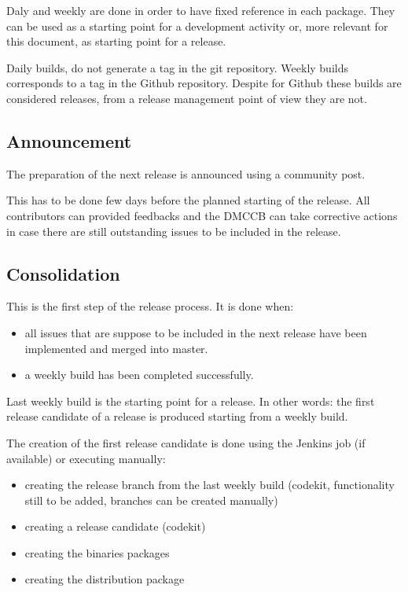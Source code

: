 Daly and weekly are done in order to have fixed reference in each package. 
They can be used as a starting point for a development activity or, more relevant for this document, as starting point for a release.

Daily builds, do not generate a tag in the git repository. 
Weekly builds corresponds to a tag in the Github repository.
Despite for Github these builds are considered releases, from a release management point of view they are not.
 
\subsection{Announcement} \label{sect:anaouncement}

The preparation of the next release is announced using a community post.

This has to be done few days before the planned starting of the release.
All contributors can provided feedbacks and the DMCCB can take corrective actions in case there are still outstanding issues to be included in the release.


\subsection{Consolidation} \label{sect:consolidation}

This is the first step of the release process.
It is done when:

\begin{itemize}
\item all issues that are suppose to be included in the next release have been implemented and merged into master.
\item a weekly build has been completed successfully.
\end{itemize}

Last weekly build is the starting point for a release. In other words: the first release candidate of a release is produced starting from a weekly build.

The creation of the first release candidate is done using the Jenkins job (if available) or executing manually:

\begin{itemize}
\item creating the release branch from the last weekly build (codekit, functionality still to be added, branches can be created manually)
\item creating a release candidate (codekit)
\item creating the binaries packages 
\item creating the distribution package
\end{itemize}

